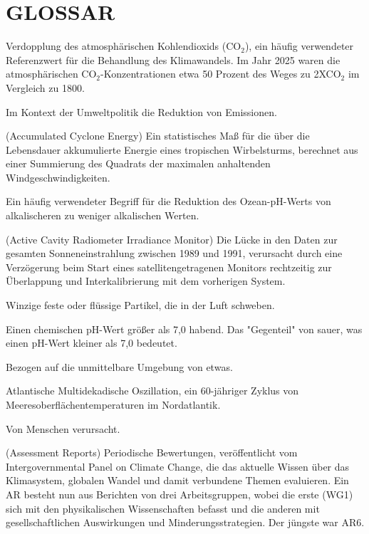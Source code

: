 \documentclass[12pt,paper=a4,DIV=12,parskip=never,chapterprefix=false,headings=standardclasses]{scrreprt}
\begin{document}
\section*{GLOSSAR}
\begin{glossar}
\item[2XCO2] Verdopplung des atmosphärischen Kohlendioxids (CO$_2$), ein häufig verwendeter Referenzwert für die Behandlung des Klimawandels. Im Jahr 2025 waren die atmosphärischen CO$_2$-Konzentrationen etwa 50 Prozent des Weges zu 2XCO$_2$ im Vergleich zu 1800.
\item[ABATEMENT] Im Kontext der Umweltpolitik die Reduktion von Emissionen.
\item[ACE] (Accumulated Cyclone Energy) Ein statistisches Maß für die über die Lebensdauer akkumulierte Energie eines tropischen Wirbelsturms, berechnet aus einer Summierung des Quadrats der maximalen anhaltenden Windgeschwindigkeiten.
\item[ACIDIFICATION] Ein häufig verwendeter Begriff für die Reduktion des Ozean-pH-Werts von alkalischeren zu weniger alkalischen Werten.
\item[ACRIM-LÜCKE] (Active Cavity Radiometer Irradiance Monitor) Die Lücke in den Daten zur gesamten Sonneneinstrahlung zwischen 1989 und 1991, verursacht durch eine Verzögerung beim Start eines satellitengetragenen Monitors rechtzeitig zur Überlappung und Interkalibrierung mit dem vorherigen System.
\item[AEROSOLE] Winzige feste oder flüssige Partikel, die in der Luft schweben.
\item[ALKALISCH] Einen chemischen pH-Wert größer als 7,0 habend. Das "Gegenteil" von sauer, was einen pH-Wert kleiner als 7,0 bedeutet.
\item[AMBIENT] Bezogen auf die unmittelbare Umgebung von etwas.
\item[AMO] Atlantische Multidekadische Oszillation, ein 60-jähriger Zyklus von Meeresoberflächentemperaturen im Nordatlantik.
\item[ANTHROPOGEN] Von Menschen verursacht.
\item[AR] (Assessment Reports) Periodische Bewertungen, veröffentlicht vom Intergovernmental Panel on Climate Change, die das aktuelle Wissen über das Klimasystem, globalen Wandel und damit verbundene Themen evaluieren. Ein AR besteht nun aus Berichten von drei Arbeitsgruppen, wobei die erste (WG1) sich mit den physikalischen Wissenschaften befasst und die anderen mit gesellschaftlichen Auswirkungen und Minderungsstrategien. Der jüngste war AR6.

\end{glossar}
\end{document}
